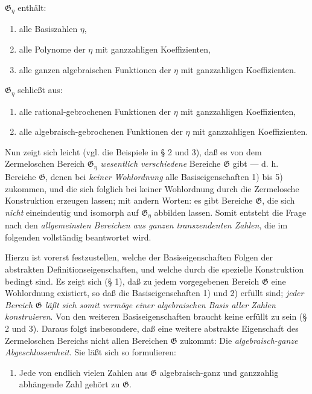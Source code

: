 $\mathfrak G_\eta$ enthält:
\begin{enumerate}
\item[1)] alle Basiszahlen $\eta$,
\item[2)] alle Polynome der $\eta$ mit ganzzahligen
Koeffizienten,
\item[3)] alle ganzen algebraischen Funktionen der $\eta$ mit ganzzahligen
Koeffizienten.
\end{enumerate}
$\mathfrak G_\eta$ schließt aus:
\begin{enumerate}
\item[4)] alle rational-gebrochenen Funktionen der $\eta$ mit ganzzahligen
Koeffizienten,
\item[5)] alle algebraisch-gebrochenen Funktionen der $\eta$ mit ganzzahligen
Koeffizienten.
\end{enumerate}

Nun zeigt sich leicht (vgl. die Beispiele in § 2 und 3), daß es von dem
Zermeloschen Bereich $\mathfrak G_\eta$ \emph{wesentlich verschiedene}
Bereiche $\mathfrak G$ gibt --- d. h. Bereiche $\mathfrak G$, denen bei
\emph{keiner Wohlordnung} alle Basiseigenschaften 1) bis 5) zukommen, und die
sich folglich bei keiner Wohlordnung durch die Zermelosche Konstruktion
erzeugen lassen; mit andern Worten: es gibt Bereiche $\mathfrak G$, die sich
\emph{nicht} eineindeutig und isomorph auf $\mathfrak G_\eta$ abbilden lassen.
Somit entsteht die Frage nach den \emph{allgemeinsten Bereichen aus ganzen
transzendenten Zahlen}, die im folgenden vollständig beantwortet wird.

Hierzu ist vorerst festzustellen, welche der Basiseigenschaften Folgen der
abstrakten Definitionseigenschaften, und welche durch die spezielle Konstruktion
bedingt sind. Es zeigt sich (§ 1), daß zu jedem vorgegebenen Bereich
$\mathfrak G$ eine Wohlordnung existiert, so daß die Basiseigenschaften 1) und
2) erfüllt sind; \emph{jeder Bereich $\mathfrak G$ läßt sich somit vermöge
einer algebraischen Basis aller Zahlen konstruieren}. Von den weiteren
Basiseigenschaften braucht keine erfüllt zu sein (§ 2 und 3). Daraus folgt
insbesondere, daß eine weitere abstrakte Eigenschaft des Zermeloschen Bereichs
nicht allen Bereichen $\mathfrak G$ zukommt: Die \emph{algebraisch-ganze
Abgeschlossenheit}. Sie läßt sich so formulieren:
\begin{enumerate}
\item[V.] Jede von endlich vielen Zahlen aus $\mathfrak G$ algebraisch-ganz
und ganzzahlig abhängende Zahl gehört zu $\mathfrak G$.
\end{enumerate}

